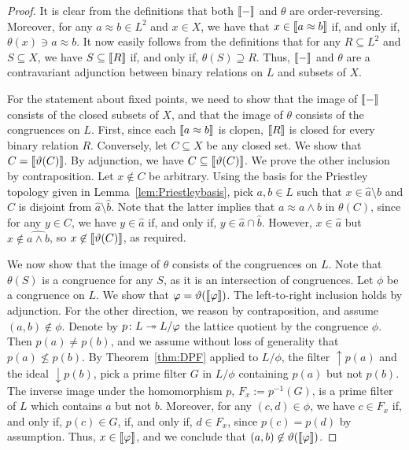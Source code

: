 \begin{proof}
  It is clear from the definitions that both $\llbracket {-} \rrbracket$ and $\theta$ are order-reversing. Moreover, for any $a \approx b \in L^2$ and $x \in X$, we have that $x \in \llbracket {a \approx b} \rrbracket$ if, and only if, $\theta(x) \ni a \approx b$. It now easily follows from the definitions that for any $R \subseteq L^2$ and $S \subseteq X$, we have $S \subseteq \llbracket {R} \rrbracket$ if, and only if, $ \theta(S) \supseteq R$. Thus, $\llbracket {-} \rrbracket$ and $\theta$ are a contravariant adjunction between binary relations on $L$ and subsets of $X$.

For the statement about fixed points, we need to show that the image of $\llbracket {-} \rrbracket$ consists of the closed subsets of $X$, and that the image of $\theta$ consists of the congruences on $L$. First, since each $\llbracket {a \approx b} \rrbracket$ is clopen, $\llbracket {R} \rrbracket$ is closed for every binary relation $R$. Conversely, let $C \subseteq X$ be any closed set. We show that $C = \llbracket {\vartheta(C)} \rrbracket$.  By adjunction, we have $C \subseteq \llbracket {\vartheta(C)} \rrbracket$. We prove the other inclusion by contraposition. Let $x \not\in C$ be arbitrary. Using the basis for the Priestley topology given in Lemma~\ref{lem:Priestleybasis}, pick $a, b \in L$ such that $x \in \widehat{a} \setminus \widehat{b}$ and $C$ is disjoint from $\widehat{a} \setminus \widehat{b}$. Note that the latter implies that $a \approx a \wedge b$ in $\theta(C)$, since for any $y \in C$, we have $y \in \widehat{a}$ if, and only if, $y \in \widehat{a} \cap \widehat{b}$. However, $x \in \widehat{a}$ but $x \not\in \widehat{a \wedge b}$, so $x \not\in \llbracket {\vartheta(C)} \rrbracket$, as required.

We now show that the image of $\theta$ consists of the congruences on $L$. Note that $\theta(S)$ is a congruence for any $S$, as it is an intersection of congruences. Let $\phi$ be a congruence on $L$. We show that $\varphi = \vartheta(\llbracket {\varphi} \rrbracket)$. The left-to-right inclusion holds by adjunction. For the other direction, we reason by contraposition, and assume $(a,b) \not\in \phi$. Denote by $p \colon L \twoheadrightarrow L/{\varphi}$ the lattice quotient by the congruence $\phi$. Then $p(a) \neq p(b)$, and we assume without loss of generality that $p(a) \nleq p(b)$. By Theorem~\ref{thm:DPF} applied to $L/{\phi}$, the filter ${\uparrow}p(a)$ and the ideal ${\downarrow}p(b)$, pick a prime filter $G$ in $L/{\phi}$ containing $p(a)$ but not $p(b)$. The inverse image under the homomorphism $p$, $F_x := p^{-1}(G)$, is a prime filter of $L$ which contains $a$ but not $b$. Moreover, for any $(c,d) \in \phi$, we have $c \in F_x$ if, and only if, $p(c) \in G$, if, and only if, $d \in F_x$, since $p(c) = p(d)$ by assumption. Thus, $x \in \llbracket {\varphi} \rrbracket$, and we conclude that $(a,b) \not\in \vartheta(\llbracket {\varphi} \rrbracket)$.
\end{proof}

